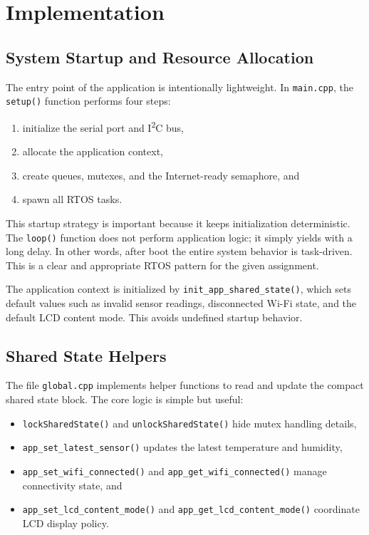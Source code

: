 \section{Implementation}

\subsection{System Startup and Resource Allocation}
The entry point of the application is intentionally lightweight. In
\texttt{main.cpp}, the \texttt{setup()} function performs four steps:
\begin{enumerate}
  \item initialize the serial port and I\textsuperscript{2}C bus,
  \item allocate the application context,
  \item create queues, mutexes, and the Internet-ready semaphore, and
  \item spawn all RTOS tasks.
\end{enumerate}

This startup strategy is important because it keeps initialization
deterministic. The \texttt{loop()} function does not perform application logic;
it simply yields with a long delay. In other words, after boot the entire
system behavior is task-driven. This is a clear and appropriate RTOS pattern
for the given assignment.

The application context is initialized by \texttt{init\_app\_shared\_state()},
which sets default values such as invalid sensor readings, disconnected Wi-Fi
state, and the default LCD content mode. This avoids undefined startup
behavior.

\subsection{Shared State Helpers}
The file \texttt{global.cpp} implements helper functions to read and update the
compact shared state block. The core logic is simple but useful:
\begin{itemize}
  \item \texttt{lockSharedState()} and \texttt{unlockSharedState()} hide mutex
  handling details,
  \item \texttt{app\_set\_latest\_sensor()} updates the latest temperature and
  humidity,
  \item \texttt{app\_set\_wifi\_connected()} and
  \texttt{app\_get\_wifi\_connected()} manage connectivity state, and
  \item \texttt{app\_set\_lcd\_content\_mode()} and
  \texttt{app\_get\_lcd\_content\_mode()} coordinate LCD display policy.
\end{itemize}

